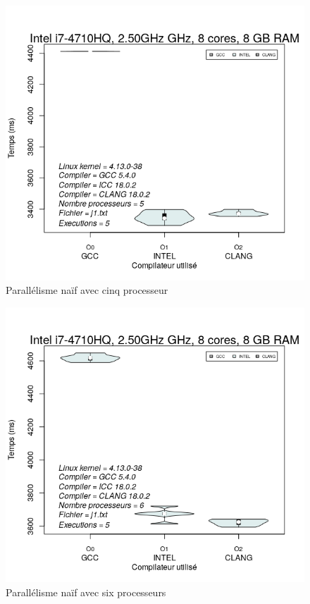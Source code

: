 \documentclass[
 aip,
 jmp,
 amsmath,amssymb,
 reprint
]{revtex4-1}
\begin{document}
\begin{figure}[H]
  \caption{Parallélisme naïf avec cinq processeur}
  \includegraphics[width=\linewidth, keepaspectratio=true]{naif_5.png}
\end{figure}

\begin{figure}[H]
  \caption{Parallélisme naïf avec six processeurs}
  \includegraphics[width=\linewidth, keepaspectratio=true]{naif_6.png}
\end{figure}
\end{document}
